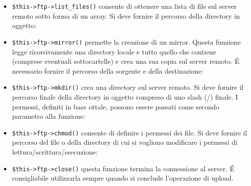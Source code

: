\begin{itemize}
\verb|$this->ftp->delete_dir()| cancella una directory e ogni cosa al suo interno. \'E necessario fornire il percorso di origine della directory in oggetto con uno slash (/) finale:


Nota: \'E molto importante prestare la massima attenzione nell'utilizzo di questa funzione. La sua natura ricorsiva consente di cancellare tutto all'interno del percorso specificato, comprese le sottocartelle e tutti i file. Assicurarsi che il percorso sia corretto utilizzando la funzione \verb|list_files()|.

\item \verb|$this->ftp->list_files()| consente di ottenere una lista di file sul server remoto sotto forma di un array. Si deve fornire il percorso della directory in oggetto:


\item \verb|$this->ftp->mirror()| permette la creazione di un mirror. Questa funzione legge ricorsivamente una directory locale e tutto quello che contiene (comprese eventuali sottocartelle) e crea una sua copia sul server remoto. \'E necessario fornire il percorso della sorgente e della destinazione:


\item \verb|$this->ftp->mkdir()| crea una directory sul server remoto. Si deve fornire il percorso finale della directory in oggetto compreso di uno slash (/) finale. I permessi, definiti in base ottale, possono essere passati come secondo parametro alla funzione:


\item \verb|$this->ftp->chmod()| consente di definire i permessi dei file. Si deve fornire il percorso del file o della directory di cui si vogliono modificare i permessi di lettura/scrittura/esecuzione:


\item \verb|$this->ftp->close()| questa funzione termina la connessione al server. \'E consigliabile utilizzarla sempre quando si conclude l'operazione di upload.
\end{itemize}